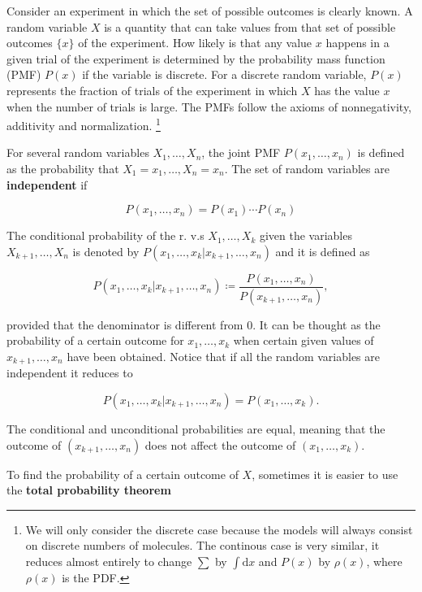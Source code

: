 Consider an experiment in which the set of possible outcomes is clearly known. A random variable $X$ is a quantity that can take values from that set of possible outcomes $\{x\}$ of the experiment. How likely is that any value $x$ happens in a given trial of the experiment is determined by the probability mass function (PMF) $P(x)$ if the variable is discrete. For a discrete random variable, $P(x)$ represents the fraction of trials of the experiment in which $X$ has the value $x$ when the number of trials is large. The PMFs follow the axioms of nonnegativity, additivity and normalization. \cite{bertsekas08} \footnote{We will only consider the discrete case because the models will always consist on discrete numbers of molecules. The continous case is very similar, it reduces almost entirely to change $\sum$ by $\int\mathrm{d}x$ and $P(x)$ by $\rho(x)$, where $\rho(x)$ is the PDF.}

For several random variables $X_1,\dotsc,X_n$, the joint PMF  $P(x_1,\dotsc,x_n)$ is defined as the probability that $X_1=x_1,\dotsc,X_n=x_n$. The set of random variables are \textbf{independent} if

\begin{equation*}
  P(x_1,\dotsc,x_n) = P(x_1)\dotsm P(x_n)
\end{equation*}

The conditional probability of the r. v.s $X_1,\dotsc,X_k$ given the variables $X_{k+1},\dotsc,X_n$ is denoted by $P(x_1,\dotsc,x_k|x_{k+1},\dotsc,x_n)$ and it is defined as

\begin{equation*}
  P(x_1,\dotsc,x_k|x_{k+1},\dotsc,x_n) \coloneqq \frac{P(x_1,\dotsc,x_n)}{P(x_{k+1},\dotsc,x_n)},
\end{equation*}

provided that the denominator is different from $0$. It can be thought as the probability of a certain outcome for $x_1,\dotsc,x_k$ when certain given values of $x_{k+1},\dotsc,x_n$ have been obtained. Notice that if all the random variables are independent it reduces to

\begin{equation*}
  P(x_1,\dotsc,x_k|x_{k+1},\dotsc,x_n) = P(x_1,\dotsc,x_k).
\end{equation*}

The conditional and unconditional probabilities are equal, meaning that the outcome of $(x_{k+1},\dotsc,x_n)$ does not affect the outcome of $(x_1,\dotsc,x_k)$.

To find the probability of a certain outcome of $X$, sometimes it is easier to use the \textbf{total probability theorem}

